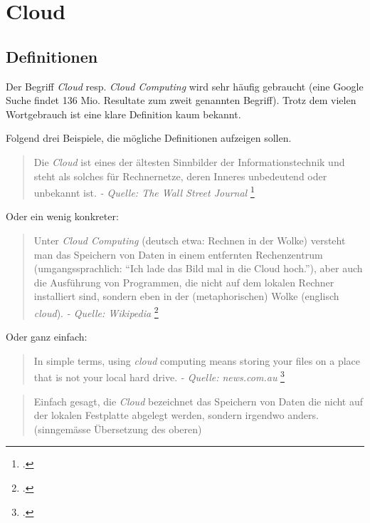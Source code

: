 \newpage
\section{Cloud}

\subsection{Definitionen}

Der Begriff \textit{Cloud} resp. \textit{Cloud Computing} wird sehr häufig gebraucht (eine Google Suche findet 136 Mio. Resultate zum zweit genannten Begriff).
Trotz dem vielen Wortgebrauch ist eine klare Definition kaum bekannt.

Folgend drei Beispiele, die mögliche Definitionen aufzeigen sollen.

\begin{quote}
	Die \textit{Cloud} ist eines der ältesten Sinnbilder der Informationstechnik und steht als solches für Rechnernetze, deren Inneres unbedeutend oder unbekannt ist. \textit{- Quelle: The Wall Street Journal}  \footcite{The_Internet_Industry_Is_on_a_Cloud_--_Whatever_That_May_Mean_-_WSJ_2014-10-03}
\end{quote}

Oder ein wenig konkreter:

\begin{quote}
	Unter \textit{Cloud Computing} (deutsch etwa: Rechnen in der Wolke) versteht man das Speichern von Daten in einem entfernten Rechenzentrum (umgangssprachlich: "`Ich lade das Bild mal in die Cloud hoch."'), aber auch die Ausführung von Programmen, die nicht auf dem lokalen Rechner installiert sind, sondern eben in der (metaphorischen) Wolke (englisch \textit{cloud}). \textit{- Quelle: Wikipedia} \footcite{Cloud_Computing__Wikipedia_2014-10-03}
\end{quote}

Oder ganz einfach:

\begin{quote}
	In simple terms, using \textit{cloud} computing means storing your files on a place that is not your local hard drive.  \textit{- Quelle: news.com.au} \footcite{What_really_is_The_Cloud?_And_how_does_it_work?_A_simple_explainer_2014-10-31}
\end{quote}
\begin{quote}
	Einfach gesagt, die \textit{Cloud} bezeichnet das Speichern von Daten die nicht auf der lokalen Festplatte abgelegt werden, sondern irgendwo anders. (sinngemässe Übersetzung des oberen)
\end{quote}

